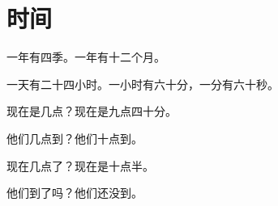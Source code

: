 \documentclass[12pt,UTF-8,openany]{ctexbook}
\begin{document}
\clearpage

\begin{center}
    
\end{center}


\hanzibox{}\hanzibox{}\hanzibox{}\hanzibox{}\hspace{1em}\hanzibox{}\hanzibox{}\hanzibox{}\hanzibox{}

\hanzibox{}\hanzibox{}\hanzibox{}\hanzibox{}\hspace{1em}\hanzibox{}\hanzibox{}\hanzibox{}\hanzibox{}

\hanzibox{}\hanzibox{}\hanzibox{}\hanzibox{}\hspace{1em}\hanzibox{}\hanzibox{}\hanzibox{}\hanzibox{}






\chapter{时间}

\begin{large}
    
    一年有四季。一年有十二个月。
    
    一天有二十四小时。一小时有六十分，一分有六十秒。
    
    现在是几点？现在是九点四十分。
    
    他们几点到？他们十点到。
    
    现在几点了？现在是十点半。
    
    他们到了吗？他们还没到。
    
\end{large}


\clearpage

\begin{center}
    
\end{center}


\hanzibox{}\hanzibox{}\hanzibox{}\hanzibox{}\hspace{1em}\hanzibox{}\hanzibox{}\hanzibox{}\hanzibox{}

\hanzibox{}\hanzibox{}\hanzibox{}\hanzibox{}\hspace{1em}\hanzibox{}\hanzibox{}\hanzibox{}\hanzibox{}
\end{document}
